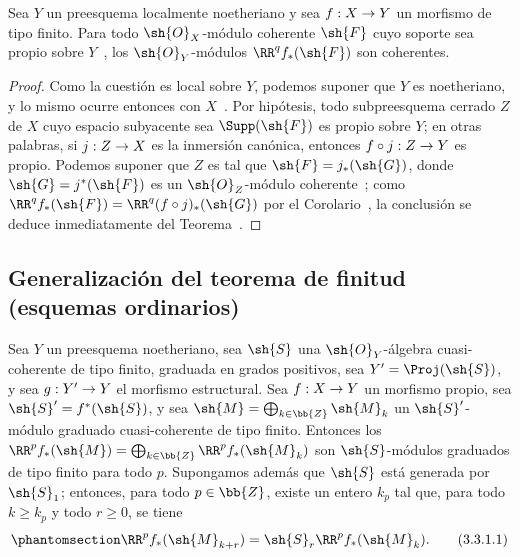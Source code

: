 \documentclass[oneside]{amsart}
\makeatletter
\renewcommand{\geq}{\geqslant}
\newcommand{\ega@arrow}[2]{\mathchoice{#1}{#2}{#2}{#2}}
\renewcommand{\to}{\ega@arrow{\longrightarrow}{\rightarrow}}
\newcommand{\oldpage}[2][]{{\marginnote{\normalfont\textbf{#1}~|~#2}}\ignorespaces}
\let\EGAOriginalLabel\label
\renewcommand{\label}[1]{\phantomsection\EGAOriginalLabel{#1}}
\makeatother
\begin{document}
\begin{corollary}[3.2.4]
\label{III.3.2.4}
Sea $Y$ un preesquema localmente noetheriano y sea $f:X\to Y$ un morfismo de tipo finito.
Para todo $\sh{O}_X$-módulo coherente $\sh{F}$ cuyo soporte sea propio sobre $Y$~, los $\sh{O}_Y$-módulos $\RR^q f_*(\sh{F})$ son coherentes.
\end{corollary}

\oldpage[III]{118}
\begin{proof}
Como la cuestión es local sobre $Y$, podemos suponer que $Y$ es noetheriano, y lo mismo ocurre entonces con $X$~.
Por hipótesis, todo subpreesquema cerrado $Z$ de $X$ cuyo espacio subyacente sea $\Supp(\sh{F})$ es propio sobre $Y$; en otras palabras, si $j:Z\to X$ es la inmersión canónica, entonces $f\circ j:Z\to Y$ es propio.
Podemos suponer que $Z$ es tal que $\sh{F}=j_*(\sh{G})$, donde $\sh{G}=j^*(\sh{F})$ es un $\sh{O}_Z$-módulo coherente~; como $\RR^q f_*(\sh{F})=\RR^q(f\circ j)_*(\sh{G})$ por el Corolario~, la conclusión se deduce inmediatamente del Teorema~.
\end{proof}

\subsection{Generalización del teorema de finitud (esquemas ordinarios)}
\label{subsection:III.3.3}

\begin{proposition}[3.3.1]
\label{III.3.3.1}
Sea $Y$ un preesquema noetheriano, sea $\sh{S}$ una $\sh{O}_Y$-álgebra cuasi-coherente de tipo finito, graduada en grados positivos, sea $Y'=\Proj(\sh{S})$, y sea $g:Y'\to Y$ el morfismo estructural.
Sea $f:X\to Y$ un morfismo propio, sea $\sh{S}'=f^*(\sh{S})$, y sea $\sh{M}=\bigoplus_{k\in\bb{Z}}\sh{M}_k$ un $\sh{S}'$-módulo graduado cuasi-coherente de tipo finito.
Entonces los $\RR^p f_*(\sh{M})=\bigoplus_{k\in\bb{Z}}\RR^p f_*(\sh{M}_k)$ son $\sh{S}$-módulos graduados de tipo finito para todo $p$.
Supongamos además que $\sh{S}$ está generada por $\sh{S}_1$; entonces, para todo $p\in\bb{Z}$, existe un entero $k_p$ tal que, para todo $k\geq k_p$ y todo $r\geq 0$, se tiene
\[
\label{III.3.3.1.1}
  \RR^p f_*(\sh{M}_{k+r})=\sh{S}_r\RR^p f_*(\sh{M}_k).
  \tag{3.3.1.1}
\] 
\end{proposition}
\end{document}

